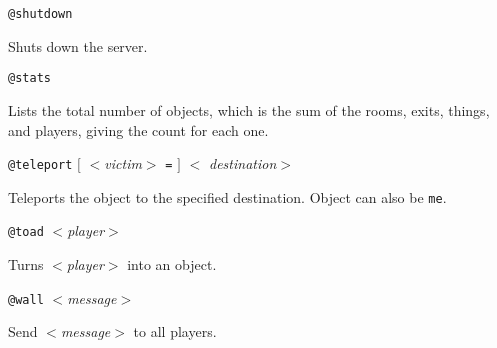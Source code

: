 \begin{simple}
\dorule

\item[]
\begin{flushleft}
{\tt @shutdown}
\end{flushleft}
Shuts down the {\tinymud} server.

\dorule

\item[]
\begin{flushleft}
{\tt @stats}
\end{flushleft}
Lists the total number of objects, which is the sum of the rooms,
exits, things, and players, giving the count for each one.

\dorule

\item[]
\begin{flushleft}
{\tt @teleport} $[$ $<${\em victim\/}$>$ \verb|=| $]$ $<${\em
destination\/}$>$
\end{flushleft}
Teleports the object to the specified destination.  Object can also be
{\tt me\/}.

\dorule

\item[]
\begin{flushleft}
{\tt @toad} $<${\em player\/}$>$
\end{flushleft}
Turns $<${\em player\/}$>$ into an object.

\dorule

\item[]
\begin{flushleft}
{\tt @wall} $<${\em message\/}$>$
\end{flushleft}
Send $<${\em message\/}$>$ to all players.

\end{simple}


\printindex


